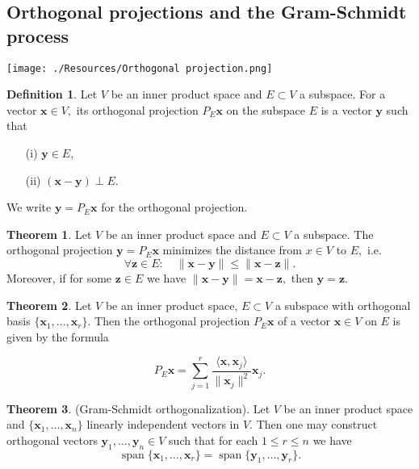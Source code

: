 \documentclass[12pt, a4paper]{article}
\newcommand{\f}[2]{\frac{#1}{#2}}
\newcommand{\mb}[1]{\mathbf{#1}}
\DeclareMathOperator{\Span}{span}
\theoremstyle{definition}
\newtheorem{definition}{Definition}[section]
\newtheorem{theorem}{Theorem}[section]
\theoremstyle{plain}
\begin{document}
\subsection{Orthogonal projections and the Gram-Schmidt process}

\texttt{[image: ./Resources/Orthogonal projection.png]}

\begin{definition}
Let $V$ be an inner product space and $E \subset V$ a subspace. For a vector $\mb{x} \in V,$ its orthogonal projection $P_E \mb{x}$ on the subspace $E$ is a vector $\mb{y}$ such that \begin{itemize}

    \item[(i)] $\mb{y}\in E,$
    \item[(ii)] $(\mb{x-y})\perp E.$

\end{itemize} We write $\mb{y}=P_E\mb{x}$ for the orthogonal projection.
\end{definition}

\begin{theorem}
Let $V$ be an inner product space and $E \subset V$ a subspace. The orthogonal projection $\mb{y}=P_E\mb{x}$ minimizes the distance from $x \in V$ to $E,$ i.e. $$\forall\mb{z} \in E: \quad \|\mb{x-y}\|\leq \|\mb{x-z}\|.$$ Moreover, if for some $\mb{z} \in E$ we have $\|\mb{x-y}\|=\mb{x-z},$ then $\mb{y=z}.$
\end{theorem}

\begin{theorem}
Let $V$ be an inner product space, $E \subset V$ a subspace with orthogonal basis $\{\mb{x}_1,\ldots,\mb{x}_r\}.$ Then the orthogonal projection $P_E\mb{x}$ of a vector $\mb{x} \in V$ on $E$ is given by the formula 

\begin{tcolorbox}
$$P_E\mb{x}=\sum_{j=1}^{r} \f{\langle \mb{x},\mb{x}_j \rangle}{\|\mb{x}_j\|^2} \mb{x}_j.$$
\end{tcolorbox}
\end{theorem}

\begin{theorem}
(Gram-Schmidt orthogonalization). Let $V$ be an inner product space and $\{\mb{x}_1,\ldots, \mb{x}_n\}$ linearly independent vectors in $V.$ Then one may construct orthogonal vectors $\mb{y}_1,\ldots,\mb{y}_n \in V$ such that for each $1 \leq r \leq n$ we have $$\Span\{\mb{x}_1,\ldots, \mb{x}_r\}=\Span\{\mb{y}_1,\ldots, \mb{y}_r\}.$$
\end{theorem}
\end{document}
